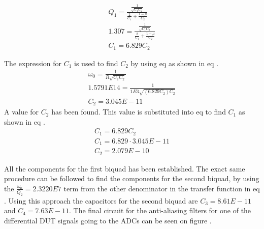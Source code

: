  \begin{equation}\label{eq:7_1_4_C1}
    \begin{aligned}
        Q_1 = \frac{ \frac{1}{\sqrt{C_1C_2}} }{ \frac{2}{C_1} + \frac{1-\mu}{C_2}}\\
        1.307 = \frac{ \frac{1}{\sqrt{C_1C_2}} }{ \frac{2}{C_1} + \frac{1-\mu}{C_2}}\\
        C_1 = 6.829C_2
    \end{aligned}
 \end{equation}

 The expression for $C_1$ is used to find $C_2$ by using eq  as shown in eq .
 \begin{equation}\label{eq:7_1_4_C2}
    \begin{aligned}
        \omega_0 = \frac{1}{R\sqrt{C_1C_2}}\\
        1.5791E14 = \frac{1}{1E3\sqrt{(6.829C_2)C_2}}\\
        C_2 = 3.045E-11
    \end{aligned}
 \end{equation}
 A value for $C_2$ has been found. This value is substituted into eq  to find $C_1$ as shown in eq .
 \begin{equation}\label{eq:7_1_4_C1_CAL}
    \begin{aligned}
        C_1 = 6.829C_2\\
        C_1 = 6.829\cdot  3.045E-11\\
        C_2 = 2.079E-10
    \end{aligned}
 \end{equation}

 All the components for the first biquad has been established. The exact same procedure can be followed to find the components for the second biquad, by using the $\frac{\omega_0}{Q_2} = 2.3220E7$ term from the other denominator in the transfer function in eq . Using this approach the capacitors for the second biquad are $C_3 = 8.61E-11$ and $C_4 = 7.63E-11$. The final circuit for the anti-aliasing filters for one of the differential DUT signals going to the ADCs can be seen on figure .

